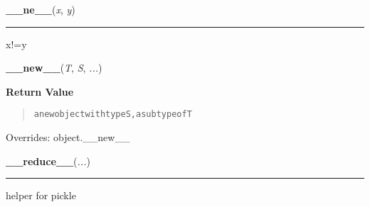     \begin{boxedminipage}{\textwidth}

    \raggedright \textbf{\_\_ne\_\_}(\textit{x}, \textit{y})

    \vspace{-1.5ex}

    \rule{\textwidth}{0.5\fboxrule}
    x!=y

    \vspace{1ex}

    \end{boxedminipage}

    \vspace{0.5ex}

    \begin{boxedminipage}{\textwidth}

    \raggedright \textbf{\_\_new\_\_}(\textit{T}, \textit{S}, \textit{...})

      \textbf{Return Value}
      \begin{quote}
\begin{alltt}
a new object with type S, a subtype of T
\end{alltt}

      \end{quote}

    \vspace{1ex}

      Overrides: object.\_\_new\_\_

    \end{boxedminipage}

    \label{object:__reduce__}

    \vspace{0.5ex}

    \begin{boxedminipage}{\textwidth}

    \raggedright \textbf{\_\_reduce\_\_}(\textit{...})

    \vspace{-1.5ex}

    \rule{\textwidth}{0.5\fboxrule}
    helper for pickle

    \vspace{1ex}

    \end{boxedminipage}

    \label{object:__reduce_ex__}

    \vspace{0.5ex}


